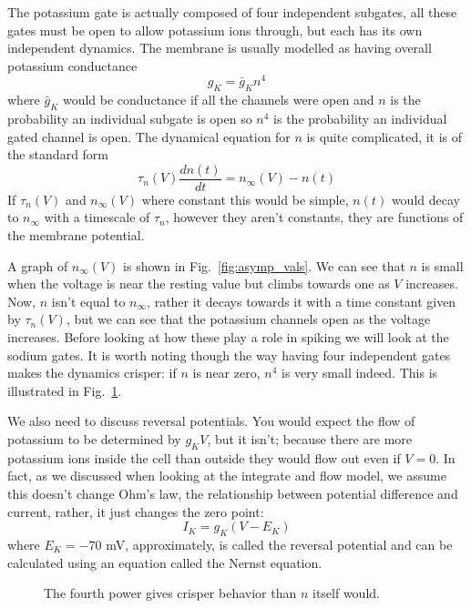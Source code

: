 \documentclass[11pt,a4paper]{scrartcl}
\begin{document}
The potassium gate is actually composed of four independent subgates,
all these gates must be open to allow potassium ions through, but each
has its own independent dynamics. The membrane is usually modelled as
having overall potassium conductance
\begin{equation}
g_{K}=\bar{g}_Kn^4
\end{equation}
where $\bar{g}_K$ would be conductance if all the channels were open
and $n$ is the probability an individual subgate is open so $n^4$ is
the probability an individual gated channel is open. The dynamical equation for $n$ is quite complicated, it is of the standard form
\begin{equation}
\tau_n(V)\frac{dn(t)}{dt}=n_\infty(V)-n(t)
\end{equation}
If $\tau_n(V)$ and $n_\infty(V)$ where constant this would be simple,
$n(t)$ would decay to $n_\infty$ with a timescale of $\tau_n$, however
they aren't constants, they are functions of the membrane potential. 

A graph of $n_\infty(V)$ is shown in Fig.~\ref{fig:asymp_vals}. We can see that $n$ is
small when the voltage is near the resting value but climbs towards
one as $V$ increases. Now, $n$ isn't equal to $n_\infty$, rather it
decays towards it with a time constant given by $\tau_n(V)$, but we
can see that the potassium channels open as the voltage
increases. Before looking at how these play a role in spiking we will
look at the sodium gates. It is worth noting though the way having
four independent gates makes the dynamics crisper: if $n$ is near
zero, $n^4$ is very small indeed. This is illustrated in
Fig.~\ref{fig:nfour}. 

We also need to discuss reversal potentials. You would expect the flow
of potassium to be determined by $g_KV$, but it isn't; because there
are more potassium ions inside the cell than outside they would flow
out even if $V=0$. In fact, as we discussed when looking at the
integrate and flow model, we assume this doesn't change Ohm's law, the
relationship between potential difference and current, rather, it just
changes the zero point:
\begin{equation}
I_K=g_K(V-E_K)
\end{equation}
where $E_K=-70$ mV, approximately, is called the reversal potential
and can be calculated using an equation called the Nernst equation.

\begin{figure}
\begin{center}

\end{center}
\caption{The fourth power gives crisper behavior than $n$ itself would.\label{fig:nfour}}
\end{figure}
\end{document}
